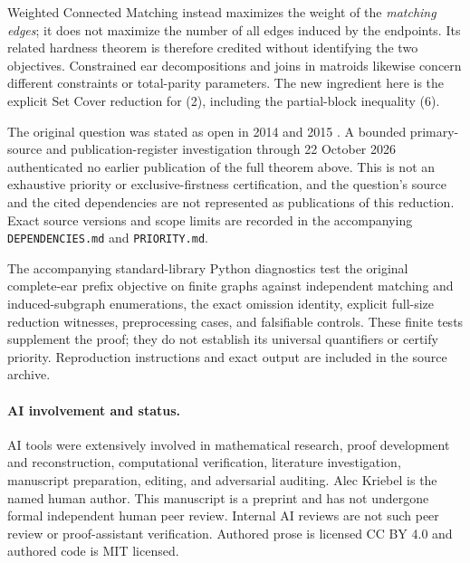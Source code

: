 \documentclass[11pt]{article}
\begin{document}
Weighted Connected Matching \cite{Gomes} instead maximizes the weight
of the \emph{matching edges}; it does not maximize the number of all
edges induced by the endpoints. Its related hardness theorem is
therefore credited without identifying the two objectives.
Constrained ear decompositions \cite{HN} and joins in matroids
\cite{BBN} likewise concern different constraints or total-parity
parameters. The new ingredient here is the explicit Set Cover reduction
for (2), including the partial-block inequality (6).

The original question was stated as open in 2014 and 2015
\cite{Sebo,BS}. A bounded primary-source and publication-register
investigation through 22 October 2026 authenticated no earlier
publication of the full theorem above. This is not an exhaustive
priority or exclusive-firstness certification, and the question's
source and the cited dependencies are not represented as publications
of this reduction. Exact source versions and scope limits are recorded
in the accompanying \texttt{DEPENDENCIES.md} and \texttt{PRIORITY.md}.

The accompanying standard-library Python diagnostics test the original
complete-ear prefix objective on finite graphs against independent
matching and induced-subgraph enumerations, the exact omission
identity, explicit full-size reduction witnesses, preprocessing cases,
and falsifiable controls. These finite tests supplement the proof;
they do not establish its universal quantifiers or certify priority.
Reproduction instructions and exact output are included in the source
archive.

\paragraph{AI involvement and status.}
AI tools were extensively involved in mathematical research, proof
development and reconstruction, computational verification, literature
investigation, manuscript preparation, editing, and adversarial auditing.
Alec Kriebel is the named human author. This manuscript is a preprint
and has not undergone formal independent human peer review. Internal
AI reviews are not such peer review or proof-assistant verification.
Authored prose is licensed CC BY 4.0 and authored code is MIT licensed.
\end{document}
